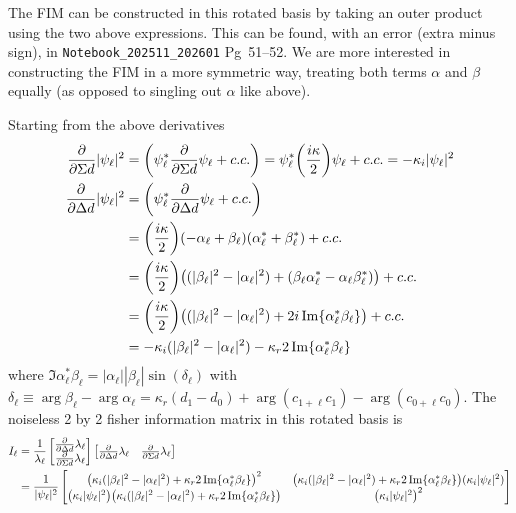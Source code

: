 \documentclass[12pt]{article}
\begin{document}
The FIM can be constructed in this rotated basis by taking an outer product using the 
two above expressions. This can be found, with an error (extra minus sign), in 
\texttt{Notebook\_202511\_202601} Pg~51--52. 
We are more interested in constructing the FIM in a more symmetric way, treating both terms 
$\alpha$ and $\beta$ equally (as opposed to singling out $\alpha$ like above).

Starting from the above derivatives 
\begin{align*}
    \pdv{\Sigma d} |\psi_\ell|^2 &= 
    \qty(\psi_\ell^* \pdv{\Sigma d} \psi_\ell + c.c.) 
    = \psi_\ell^*\qty(\frac{i\kappa}{2})\psi_\ell  + c.c. 
    = -\kappa_i |\psi_\ell|^2 \\
    \pdv{\Delta d} |\psi_\ell|^2 &=
    \qty(\psi_\ell^* \pdv{\Delta d} \psi_\ell + c.c.) \\
        &= \qty(\frac{i\kappa}{2})(-\alpha_\ell + \beta_\ell)(\alpha_\ell^* + \beta_\ell^*) + c.c. \\
        &= \qty(\frac{i\kappa}{2})
            \qty( 
                (|\beta_\ell|^2 - |\alpha_\ell|^2)  + 
                (\beta_\ell \alpha_\ell^* - \alpha_\ell \beta_\ell^*)
            ) + c.c. \\
        &= \qty(\frac{i\kappa}{2})
            \qty( 
                (|\beta_\ell|^2 - |\alpha_\ell|^2)  + 
                2i\Im{\alpha_\ell^*\beta_\ell}
            ) + c.c.\\
        &= -\kappa_i (|\beta_\ell|^2 - |\alpha_\ell|^2) - 
            \kappa_r 2 \Im{\alpha_\ell^*\beta_\ell}
\end{align*}
where $\Im{\alpha_\ell^*\beta_\ell} = |\alpha_\ell||\beta_\ell|\sin(\delta_\ell)$ 
with $\delta_\ell \equiv \arg{\beta_\ell} - \arg{\alpha_\ell} 
= \kappa_r (d_1 - d_0) + \arg(c_{1+\ell} c_{1}) - \arg(c_{0+\ell} c_{0})$.
The noiseless 2 by 2 fisher information matrix in this rotated basis is 
\begin{align*}
    I_\ell &= 
    \frac{1}{\lambda_\ell} \begin{bmatrix}
    \pdv{\Delta d} \lambda_\ell \\
    \pdv{\Sigma d} \lambda_\ell\\
\end{bmatrix}
\begin{bmatrix}
    \pdv{\Delta d} \lambda_\ell &
    \pdv{\Sigma d} \lambda_\ell \\
\end{bmatrix}\\
&=
\frac{1}{|\psi_\ell|^2} \begin{bmatrix}
    \qty(\kappa_i (|\beta_\ell|^2 - |\alpha_\ell|^2) + 
        \kappa_r 2 \Im{\alpha_\ell^*\beta_\ell})^2 &
    \qty(\kappa_i (|\beta_\ell|^2 - |\alpha_\ell|^2) + 
        \kappa_r 2 \Im{\alpha_\ell^*\beta_\ell})(\kappa_i |\psi_\ell|^2) \\
    \qty(\kappa_i |\psi_\ell|^2)
    \qty(\kappa_i (|\beta_\ell|^2 - |\alpha_\ell|^2) + 
        \kappa_r 2 \Im{\alpha_\ell^*\beta_\ell}) &
    \qty(\kappa_i |\psi_\ell|^2)^2 
\end{bmatrix} 
\end{align*}
\end{document}
